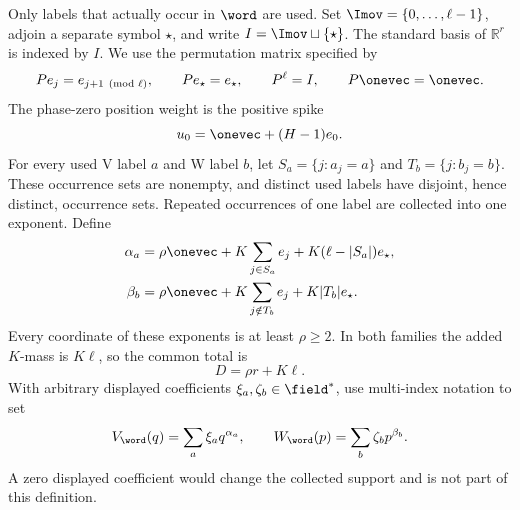 \documentclass[11pt,letterpaper]{article}
\theoremstyle{definition}
\theoremstyle{remark}
\numberwithin{equation}{section}
\begin{document}
Only labels that actually occur in \(\word\) are used.  Set
\(\Imov=\{0,\ldots,\ell-1\}\), adjoin a separate symbol \(\star\), and
write \(I=\Imov\sqcup\{\star\}\).  The standard basis of
\(\mathbb R^r\) is indexed by \(I\).  We use the permutation matrix
specified by
\begin{equation}
 Pe_j=e_{j+1\pmod\ell},\qquad Pe_\star=e_\star,
 \qquad P^\ell=I,\qquad P\onevec=\onevec.
 \label{eq:permutation}
\end{equation}
The phase-zero position weight is the positive spike
\begin{equation}
 u_0=\onevec+(H-1)e_0.
 \label{eq:spike}
\end{equation}
For every used V label \(a\) and W label \(b\), let
\(S_a=\{j:a_j=a\}\) and \(T_b=\{j:b_j=b\}\).  These occurrence sets are
nonempty, and distinct used labels have disjoint, hence distinct,
occurrence sets.  Repeated occurrences of one label are collected into one
exponent.  Define
\begin{equation}
 \begin{aligned}
 \alpha_a&=\rho\onevec+K\sum_{j\in S_a}e_j
       +K(\ell-|S_a|)e_\star,\\
 \beta_b&=\rho\onevec+K\sum_{j\notin T_b}e_j
       +K|T_b|e_\star.
 \end{aligned}
 \label{eq:incidence-exponents}
\end{equation}
Every coordinate of these exponents is at least \(\rho\geq2\).  In both
families the added \(K\)-mass is \(K\ell\), so the common total is
\begin{equation}
 D=\rho r+K\ell.
 \label{eq:common-total}
\end{equation}
With arbitrary displayed coefficients \(\xi_a,\zeta_b\in\field^*\), use
multi-index notation to set
\begin{equation}
 V_{\word}(q)=\sum_a\xi_a q^{\alpha_a},
 \qquad
 W_{\word}(p)=\sum_b\zeta_b p^{\beta_b}.
 \label{eq:hamiltonians}
\end{equation}
A zero displayed coefficient would change the collected support and is not
part of this definition.
\end{document}
